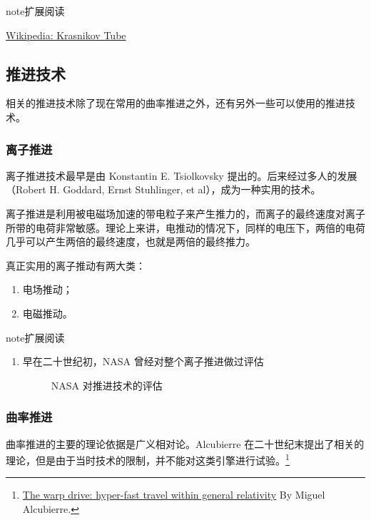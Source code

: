 \documentclass[letterpaper,10pt]{sphinxmanual}
\begin{document}
\begin{notice}{note}{扩展阅读}

\href{https://en.wikipedia.org/wiki/Krasnikov\_tube}{Wikipedia: Krasnikov Tube}
\end{notice}


\subsection{推进技术}
\label{tech:id8}
相关的推进技术除了现在常用的曲率推进之外，还有另外一些可以使用的推进技术。


\subsubsection{离子推进}
\label{tech:id9}
离子推进技术最早是由 Konstantin E. Tsiolkovsky 提出的。后来经过多人的发展（Robert H. Goddard, Ernst Stuhlinger, et al），成为一种实用的技术。

离子推进是利用被电磁场加速的带电粒子来产生推力的，而离子的最终速度对离子所带的电荷非常敏感。理论上来讲，电推动的情况下，同样的电压下，两倍的电荷几乎可以产生两倍的最终速度，也就是两倍的最终推力。

真正实用的离子推动有两大类：
\begin{enumerate}
\item {} 
电场推动；

\item {} 
电磁推动。

\end{enumerate}

\begin{notice}{note}{扩展阅读}
\begin{enumerate}
\item {} 
早在二十世纪初，NASA 曾经对整个离子推进做过评估
\begin{figure}[htbp]
\centering
\capstart
\caption{NASA 对推进技术的评估}\end{figure}

\end{enumerate}
\end{notice}


\subsubsection{曲率推进}
\label{tech:index-4}\label{tech:id10}
曲率推进的主要的理论依据是广义相对论。Alcubierre 在二十世纪末提出了相关的理论，但是由于当时技术的限制，并不能对这类引擎进行试验。\footnote{
\href{http://arxiv.org/abs/gr-qc/0009013}{The warp drive: hyper-fast travel within general relativity} By Miguel Alcubierre.
}
\end{document}
